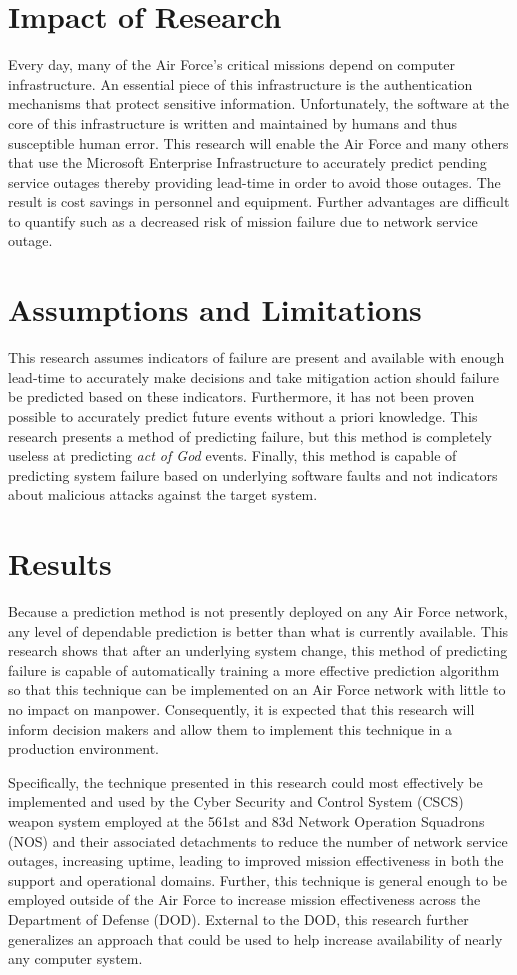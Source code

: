 \section{Impact of Research}
Every day, many of the Air Force's critical missions depend on computer
infrastructure.  An essential piece of this infrastructure is the
authentication mechanisms that protect  sensitive information.  Unfortunately,
the software at the core of this infrastructure is written and maintained by
humans and thus susceptible human error.  This research will enable the Air
Force and many others that use the Microsoft Enterprise Infrastructure to
accurately predict pending service outages thereby providing lead-time in order
to avoid those outages.  The result is cost savings in personnel and equipment.
Further advantages are difficult to quantify such as a decreased risk of
mission failure due to network service outage.

\section{Assumptions and Limitations}
This research assumes indicators of failure are present and available with
enough lead-time to accurately make decisions and take mitigation action should
failure be predicted based on these indicators.  Furthermore, it has not been
proven possible to accurately predict future events without a priori knowledge.
This research presents a method of predicting failure, but this method is
completely useless at predicting \emph{act of God} events.  Finally, this
method is capable of predicting system failure based on underlying software
faults and not indicators about malicious attacks against the target system.

\section{Results}
Because a prediction method is not presently deployed on any Air Force network,
any level of dependable prediction is better than what is currently
available.  This research shows that after an underlying system change, this
method of predicting failure is capable of automatically training a more
effective prediction algorithm so that this technique can be implemented on an
Air Force network with little to no impact on manpower.  Consequently, it is
expected that this research will inform decision makers and allow them to
implement this technique in a production environment.

Specifically, the technique presented in this research could most effectively
be implemented and used by the Cyber Security and Control System (CSCS) weapon
system employed at the 561st and 83d Network Operation Squadrons (NOS) and
their associated detachments to reduce the number of network service outages,
increasing uptime, leading to improved mission effectiveness in both the
support and operational domains.  Further, this technique is general enough to
be employed outside of the Air Force to increase mission effectiveness across
the Department of Defense (DOD).  External to the DOD, this research further
generalizes an approach that could be used to help increase availability of
nearly any computer system.
